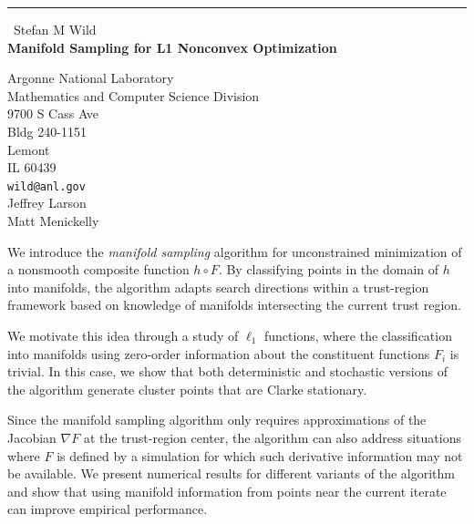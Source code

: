 \documentclass{report}
\begin{document}
\begin{center}
\rule{6in}{1pt} \
{\large Stefan M Wild \\
{\bf Manifold Sampling for L1 Nonconvex Optimization}}

Argonne National Laboratory \\ Mathematics and Computer Science Division \\ 9700 S Cass Ave \\ Bldg 240-1151 \\ Lemont \\ IL 60439
\\
{\tt wild@anl.gov}\\
Jeffrey Larson\\
Matt Menickelly\end{center}

We introduce the \emph{manifold sampling} algorithm for
unconstrained minimization of
a nonsmooth composite function $h\circ F$. By classifying points in the domain
of $h$ into manifolds, the algorithm adapts search directions within a
trust-region framework based
on knowledge of manifolds
intersecting the current trust region.

We motivate this idea through a study of $\ell_1$ functions, where the
classification into manifolds using zero-order information about the
constituent functions $F_i$ is trivial.
In this case, we show that both deterministic and stochastic versions of the
algorithm generate cluster points that are Clarke stationary.


Since the manifold sampling algorithm only requires approximations of the
Jacobian $\nabla F$ at the trust-region center, the algorithm can also address
situations where $F$ is defined by a simulation for which such derivative
information may not be available.
We present numerical results for different variants of the algorithm and
show that
using manifold information from points near the current iterate can improve
empirical performance.
\end{document}
